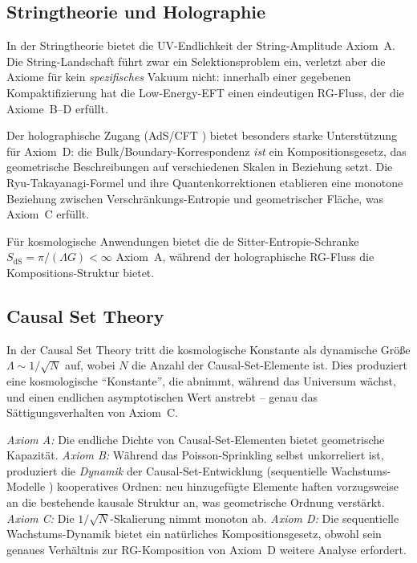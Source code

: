 \documentclass[aps,prd,twocolumn,superscriptaddress,nofootinbib]{revtex4-2}
\begin{document}
\subsection{Stringtheorie und Holographie}

In der Stringtheorie bietet die UV-Endlichkeit der String-Amplitude Axiom~A. Die String-Landschaft führt zwar ein Selektionsproblem ein, verletzt aber die Axiome für kein \textit{spezifisches} Vakuum nicht: innerhalb einer gegebenen Kompaktifizierung hat die Low-Energy-EFT einen eindeutigen RG-Fluss, der die Axiome~B--D erfüllt.

Der holographische Zugang (AdS/CFT \cite{Maldacena1999}) bietet besonders starke Unterstützung für Axiom~D: die Bulk/Boundary-Korrespondenz \textit{ist} ein Kompositionsgesetz, das geometrische Beschreibungen auf verschiedenen Skalen in Beziehung setzt. Die Ryu-Takayanagi-Formel \cite{Ryu2006} und ihre Quantenkorrektionen etablieren eine monotone Beziehung zwischen Verschränkungs-Entropie und geometrischer Fläche, was Axiom~C erfüllt.

Für kosmologische Anwendungen bietet die de Sitter-Entropie-Schranke $S_{\mathrm{dS}} = \pi/(\Lambda G) < \infty$ Axiom~A, während der holographische RG-Fluss \cite{deBoer2000} die Kompositions-Struktur bietet.

\subsection{Causal Set Theory}

In der Causal Set Theory \cite{Sorkin2003,Surya2019} tritt die kosmologische Konstante als dynamische Größe $\Lambda \sim 1/\sqrt{N}$ auf, wobei $N$ die Anzahl der Causal-Set-Elemente ist. Dies produziert eine kosmologische ``Konstante'', die abnimmt, während das Universum wächst, und einen endlichen asymptotischen Wert anstrebt -- genau das Sättigungsverhalten von Axiom~C.

\textit{Axiom A:} Die endliche Dichte von Causal-Set-Elementen bietet geometrische Kapazität. \textit{Axiom B:} Während das Poisson-Sprinkling selbst unkorreliert ist, produziert die \textit{Dynamik} der Causal-Set-Entwicklung (sequentielle Wachstums-Modelle \cite{Surya2019}) kooperatives Ordnen: neu hinzugefügte Elemente haften vorzugsweise an die bestehende kausale Struktur an, was geometrische Ordnung verstärkt. \textit{Axiom C:} Die $1/\sqrt{N}$-Skalierung nimmt monoton ab. \textit{Axiom D:} Die sequentielle Wachstums-Dynamik bietet ein natürliches Kompositionsgesetz, obwohl sein genaues Verhältnis zur RG-Komposition von Axiom~D weitere Analyse erfordert.
\end{document}
